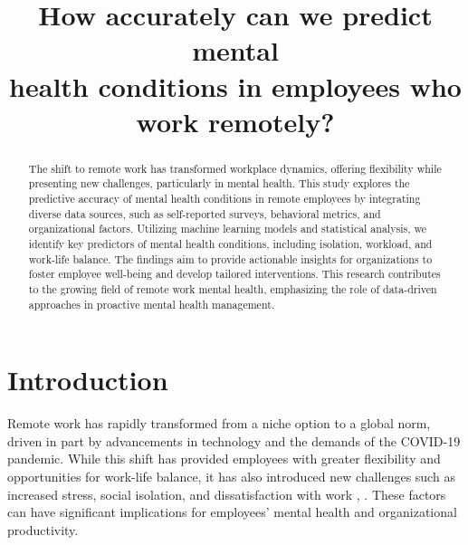 \documentclass[conference]{IEEEtran}
\begin{document}
\title{How accurately can we predict mental \\health conditions in employees who work remotely?}

\author{
\and
{}
\and
{}
}

\maketitle

\begin{abstract}
The shift to remote work has transformed workplace dynamics, offering flexibility while presenting new challenges, particularly in mental health. This study explores the predictive accuracy of mental health conditions in remote employees by integrating diverse data sources, such as self-reported surveys, behavioral metrics, and organizational factors. Utilizing machine learning models and statistical analysis, we identify key predictors of mental health conditions, including isolation, workload, and work-life balance. The findings aim to provide actionable insights for organizations to foster employee well-being and develop tailored interventions. This research contributes to the growing field of remote work mental health, emphasizing the role of data-driven approaches in proactive mental health management.
\end{abstract}

\IEEEpeerreviewmaketitle


\section{Introduction}
Remote work has rapidly transformed from a niche option to a global norm, driven in part by advancements in technology and the demands of the COVID-19 pandemic. While this shift has provided employees with greater flexibility and opportunities for work-life balance, it has also introduced new challenges such as increased stress, social isolation, and dissatisfaction with work \cite{ref1}, \cite{ref2}. These factors can have significant implications for employees' mental health and organizational productivity.
\end{document}
